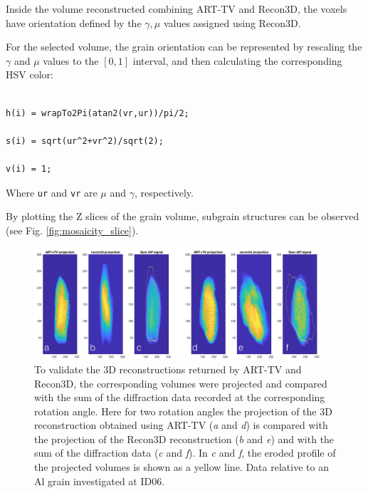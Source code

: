 \documentclass[11pt]{scrartcl}
\begin{document}
Inside the volume reconstructed combining {\footnotesize{ART-TV}} and Recon3D, the voxels have orientation defined by the $\gamma, \mu$ values assigned using Recon3D.

For the selected volume, the grain orientation can be represented by rescaling the $\gamma$ and $\mu$ values to the $[0,1]$ interval, and then calculating the corresponding HSV color: 

\begin{verbatim}

h(i) = wrapTo2Pi(atan2(vr,ur))/pi/2;

s(i) = sqrt(ur^2+vr^2)/sqrt(2);

v(i) = 1;

\end{verbatim}

Where {\texttt{ur}} and {\texttt{vr}} are $\mu$ and $\gamma$, respectively.

By plotting the {\footnotesize{Z}} slices of the grain volume, subgrain structures can be observed (see Fig. \ref{fig:mosaicity_slice}).

\begin{figure}
    \centering
    \includegraphics[width=0.95\textwidth]{compare_proj_diff_all_proj.png}
    \caption{To validate the 3D reconstructions returned by {\footnotesize{ART-TV}} and Recon3D, the corresponding volumes were projected and compared with the sum of the diffraction data recorded at the corresponding rotation angle. Here for two rotation angles the projection of the {\footnotesize{3D}} reconstruction obtained using {\footnotesize{ART-TV}} ({\emph{a}} and {\emph{d}}) is compared with the projection of the Recon3D reconstruction ({\emph{b}} and {\emph{e}}) and with the sum of the diffraction data ({\emph{c}} and {\emph{f}}). In {\emph{c}} and {\emph{f}}, the eroded profile of the projected volumes is shown as a yellow line. Data relative to an Al grain investigated at {\footnotesize{ID06}}.}
    \label{fig:compare_proj}
\end{figure}
\end{document}
